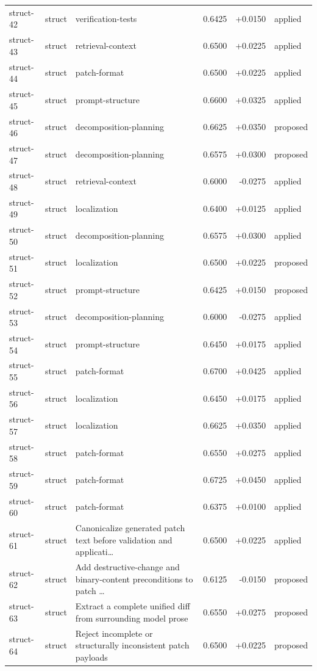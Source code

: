 \begin{center}
\begin{longtable}{llp{5.2cm}rrl}
struct-42 & struct & verification-tests & 0.6425 & +0.0150 & applied \\
struct-43 & struct & retrieval-context & 0.6500 & +0.0225 & applied \\
struct-44 & struct & patch-format & 0.6500 & +0.0225 & applied \\
struct-45 & struct & prompt-structure & 0.6600 & +0.0325 & applied \\
struct-46 & struct & decomposition-planning & 0.6625 & +0.0350 & proposed \\
struct-47 & struct & decomposition-planning & 0.6575 & +0.0300 & proposed \\
struct-48 & struct & retrieval-context & 0.6000 & -0.0275 & applied \\
struct-49 & struct & localization & 0.6400 & +0.0125 & applied \\
struct-50 & struct & decomposition-planning & 0.6575 & +0.0300 & applied \\
struct-51 & struct & localization & 0.6500 & +0.0225 & proposed \\
struct-52 & struct & prompt-structure & 0.6425 & +0.0150 & proposed \\
struct-53 & struct & decomposition-planning & 0.6000 & -0.0275 & applied \\
struct-54 & struct & prompt-structure & 0.6450 & +0.0175 & applied \\
struct-55 & struct & patch-format & 0.6700 & +0.0425 & applied \\
struct-56 & struct & localization & 0.6450 & +0.0175 & applied \\
struct-57 & struct & localization & 0.6625 & +0.0350 & applied \\
struct-58 & struct & patch-format & 0.6550 & +0.0275 & applied \\
struct-59 & struct & patch-format & 0.6725 & +0.0450 & applied \\
struct-60 & struct & patch-format & 0.6375 & +0.0100 & applied \\
struct-61 & struct & Canonicalize generated patch text before validation and applicati\ldots{} & 0.6500 & +0.0225 & applied \\
struct-62 & struct & Add destructive-change and binary-content preconditions to patch \ldots{} & 0.6125 & -0.0150 & proposed \\
struct-63 & struct & Extract a complete unified diff from surrounding model prose & 0.6550 & +0.0275 & proposed \\
struct-64 & struct & Reject incomplete or structurally inconsistent patch payloads & 0.6500 & +0.0225 & proposed \\

\end{longtable}
\end{center}
